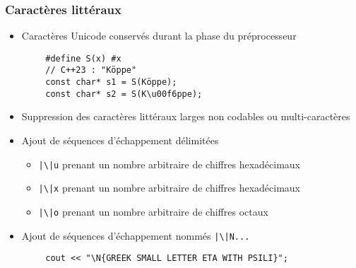 \documentclass[C++.tex]{subfiles}
\begin{document}
\begin{frame}[fragile]
	\frametitle{Caractères littéraux}
	\begin{itemize}
		\item Caractères Unicode conservés durant la phase du préprocesseur
	\end{itemize}

	\begin{verbatim}
		#define S(x) #x
		// C++23 : "Köppe"
		const char* s1 = S(Köppe);
		const char* s2 = S(K\u00f6ppe);
	\end{verbatim}

	\begin{itemize}
		\item Suppression des caractères littéraux larges non codables ou multi-caractères
		\item Ajout de séquences d'échappement délimitées
		\begin{itemize}
			\item \texttt{|\textbackslash|u{}} prenant un nombre arbitraire de chiffres hexadécimaux
			\item \texttt{|\textbackslash|x{}} prenant un nombre arbitraire de chiffres hexadécimaux
			\item \texttt{|\textbackslash|o{}} prenant un nombre arbitraire de chiffres octaux
		\end{itemize}
		\item Ajout de séquences d'échappement nommés \texttt{|\textbackslash|N{...}}
	\end{itemize}

	\begin{verbatim}
		cout << "\N{GREEK SMALL LETTER ETA WITH PSILI}";
	\end{verbatim}



\end{frame}
\end{document}
